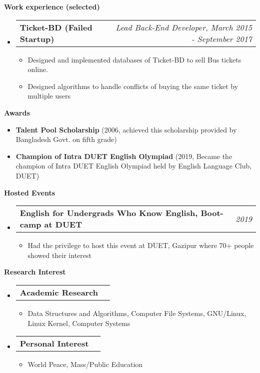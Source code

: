 \documentclass[letterpaper,10pt]{article}
\makeatletter
\newcommand{\resheading}[1]{{\large \colorbox{mygrey}{\begin{minipage}{\textwidth}{\textbf{#1 \vphantom{p\^{E}}}}\end{minipage}}}}
\newcommand{\ressubheading}[4]{
	\begin{tabular*}{7.0in}{l@{\extracolsep{\fill}}r}
		\textbf{#1} & \textit{#4} \\
	\end{tabular*}\vspace{-6pt}}
\makeatother
\begin{document}
	\resheading{Work experience (selected)}
	\begin{itemize}
		\item \ressubheading{Ticket-BD (Failed Startup)}{}{}{Lead Back-End Developer, March 2015 - September 2017}
		\begin{itemize}
			\item Designed and implemented databases of Ticket-BD to sell Bus tickets online.
			\item Designed algorithms to handle conflicts of buying the same ticket by multiple users 
		\end{itemize}
		
	\end{itemize}
	
	\vspace{0.2in}
	
	\resheading{Awards}
	\begin{itemize}
		\item \textbf{Talent Pool Scholarship} (2006, achieved this scholarship provided by Bangladesh Govt. on fifth grade)
		\item \textbf{Champion of Intra DUET English Olympiad} (2019, Became the champion of Intra DUET English Olympiad held by English Language Club, DUET)
	\end{itemize}
	
	\vspace{0.2in}
	
	\resheading{Hosted Events}
	\begin{itemize}
		\item \ressubheading{English for Undergrads Who Know English, Boot-camp at DUET}{}{}{2019}
		\begin{itemize}
			\item Had the privilege to host this event at DUET, Gazipur where 70+ people showed their interest
		\end{itemize}
	\end{itemize}
	
	\vspace{0.2in}
	
	\resheading{Research Interest}
	\begin{itemize}
		\item \ressubheading{Academic Research}{}{}{}
		\begin{itemize}
			\item Data Structures and Algorithms, Computer File Systems, GNU/Linux, Linux Kernel, Computer Systems
		\end{itemize}
		
		\item \ressubheading{Personal Interest}{}{}{}
		\begin{itemize}
			\item World Peace, Mass/Public Education
		\end{itemize}
	\end{itemize}
\vfill
\end{document}
